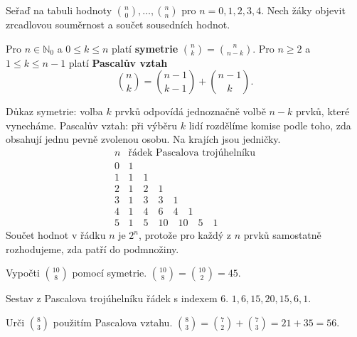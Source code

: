 \documentclass[11pt,a4paper]{article}
\begin{document}

Seřaď na tabuli hodnoty $\binom n0,\ldots,\binom nn$ pro $n=0,1,2,3,4$. Nech žáky objevit zrcadlovou souměrnost a součet sousedních hodnot.



\begin{definiceBox}
Pro $n\in\mathbb N_0$ a $0\le k\le n$ platí \textbf{symetrie} $\binom nk=\binom n{n-k}$. Pro $n\ge2$ a $1\le k\le n-1$ platí \textbf{Pascalův vztah}
\[
\binom nk=\binom{n-1}{k-1}+\binom{n-1}{k}.
\]
\end{definiceBox}
Důkaz symetrie: volba $k$ prvků odpovídá jednoznačně volbě $n-k$ prvků, které vynecháme. Pascalův vztah: při výběru $k$ lidí rozdělíme komise podle toho, zda obsahují jednu pevně zvolenou osobu. Na krajích jsou jedničky.
\[
\begin{array}{c|l}
n&\text{řádek Pascalova trojúhelníku}\\\hline
0&1\\
1&1\quad1\\
2&1\quad2\quad1\\
3&1\quad3\quad3\quad1\\
4&1\quad4\quad6\quad4\quad1\\
5&1\quad5\quad10\quad10\quad5\quad1
\end{array}
\]
Součet hodnot v řádku $n$ je $2^n$, protože pro každý z $n$ prvků samostatně rozhodujeme, zda patří do podmnožiny.


\begin{prikladReseniBox}[title={Příklad 1}]
Vypočti $\binom{10}{8}$ pomocí symetrie.
\tcblower
$\binom{10}{8}=\binom{10}{2}=45$.
\end{prikladReseniBox}



\begin{prikladReseniBox}[title={Příklad 2}]
Sestav z Pascalova trojúhelníku řádek s indexem $6$.
\tcblower
$1,6,15,20,15,6,1$.
\end{prikladReseniBox}



\begin{prikladReseniBox}[title={Příklad 3}]
Urči $\binom83$ použitím Pascalova vztahu.
\tcblower
$\binom83=\binom72+\binom73=21+35=56$.
\end{prikladReseniBox}
\end{document}
